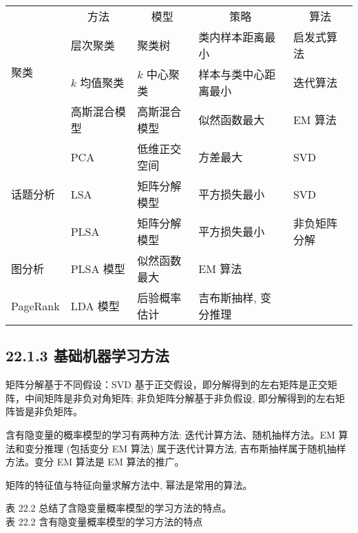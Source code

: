 \documentclass[10pt]{article}
\begin{document}
\begin{CJK*}{UTF8}{bsmi}
\begin{center}
\begin{tabular}{l|l|l|l|l}
\hline
\multirow{4}{*}{聚类} & \multicolumn{1}{|c|}{方法} & \multicolumn{1}{c|}{模型} & \multicolumn{1}{c}{策略} & \multicolumn{1}{c}{算法} \\
\cline { 2 - 5 }
 & 层次聚类 & 聚类树 & 类内样本距离最小 & 启发式算法 \\
\cline { 2 - 5 }
 & $k$ 均值聚类 & $k$ 中心聚类 & 样本与类中心距离最小 & 迭代算法 \\
\cline { 2 - 5 }
 & 高斯混合模型 & 高斯混合模型 & 似然函数最大 & EM 算法 \\
\hline
\multirow{3}{*}{话题分析} & PCA & 低维正交空间 & 方差最大 & SVD \\
\cline { 2 - 5 }
 & LSA & 矩阵分解模型 & 平方损失最小 & SVD \\
\cline { 2 - 5 }
 & PLSA & 矩阵分解模型 & 平方损失最小 & 非负矩阵分解 \\
\cline { 2 - 5 }
图分析 & PLSA 模型 & 似然函数最大 & EM 算法 &  \\
\hline
\multirow{2}{*}{PageRank} & LDA 模型 & 后验概率估计 & 吉布斯抽样, 变分推理 &  \\
\hline
\end{tabular}
\end{center}

\subsection*{22.1.3 基础机器学习方法}
矩阵分解基于不同假设：SVD 基于正交假设，即分解得到的左右矩阵是正交矩阵，中间矩阵是非负对角矩阵; 非负矩阵分解基于非负假设, 即分解得到的左右矩阵皆是非负矩阵。

含有隐变量的概率模型的学习有两种方法: 迭代计算方法、随机抽样方法。EM 算法和变分推理 (包括变分 EM 算法) 属于迭代计算方法, 吉布斯抽样属于随机抽样方法。变分 EM 算法是 EM 算法的推广。

矩阵的特征值与特征向量求解方法中, 幂法是常用的算法。

表 22.2 总结了含隐变量概率模型的学习方法的特点。\\
表 22.2 含有隐变量概率模型的学习方法的特点


\end{CJK*}
\end{document}
